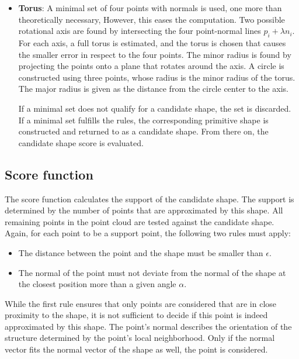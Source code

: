 \begin{itemize}
    \item \textbf{Torus}:
    A minimal set of four points with normals is used, one more than theoretically necessary, However, this eases the computation.
    Two possible rotational axis are found by intersecting the four point-normal lines $p_i +  \lambda n_i$\cite{marshall2001robust}. For each axis, a full torus is estimated, and the torus is chosen that causes the smaller error in respect to the four points. The minor radius is found by projecting the points onto a plane that rotates around the axis. A circle is constructed using three points, whose radius is the minor radius of the torus. The major radius is given as the distance from the circle center to the axis. 


If a minimal set does not qualify for a candidate shape, the set is discarded. If a minimal set fulfills the rules, the corresponding primitive shape is constructed and returned to as a candidate shape. From there on, the candidate shape score is evaluated. 

\end{itemize} 

\subsection{Score function}
\label{sec:scorefun}

The score function calculates the support of the candidate shape. The support is determined by the number of points that are approximated by this shape. All remaining points in the point cloud are tested against the candidate shape. Again, for each point to be a support point, the following two rules must apply: 

\begin{itemize}
    \item The distance between the point and the shape must be smaller than $\epsilon$.
    \item The normal of the point must not deviate from the normal of the shape at the closest position more than a given angle $\alpha$.
\end{itemize}

While the first rule ensures that only points are considered that are in close proximity to the shape, it is not sufficient to decide if this point is indeed approximated by this shape. The point's normal describes the orientation of the structure determined by the point's local neighborhood. Only if the normal vector fits the normal vector of the shape as well, the point is considered. 

